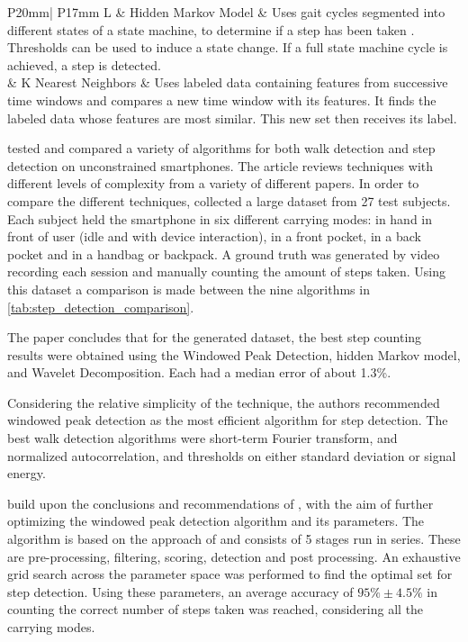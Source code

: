 \begin{table}[]
\begin{tabularx}{\linewidth}{ P{20mm}| P{17mm} L}
		 & Hidden Markov Model & Uses gait cycles segmented into different states of a state machine, to determine if a step has been taken \cite{Ren2016a}. Thresholds can be used to induce a state change. If a full state machine cycle is achieved, a step is detected.\\ 
		& K Nearest Neighbors & Uses labeled data containing features from successive time windows and compares a new time window with its features. It finds the labeled data whose features are most similar. This new set then receives its label. \\
		\bottomrule
	\end{tabularx}
	\caption{Overview of different step detection methods using inertial sensors.}
	\label{tab:step_detection_comparison}
\end{table}

\citet{Brajdic2013} tested and compared a variety of algorithms for both walk detection and step detection on unconstrained smartphones. The article reviews techniques with different levels of complexity from a variety of different papers. In order to compare the different techniques, \cite{Brajdic2013} collected a large dataset from 27 test subjects. Each subject held the smartphone in six different carrying modes: in hand in front of user (idle and with device interaction), in a front pocket, in a back pocket and in a handbag or backpack. A ground truth was generated by video recording each session and manually counting the amount of steps taken. Using this dataset a comparison is made between the nine algorithms in \cref{tab:step_detection_comparison}.\par 
The paper concludes that for the generated dataset, the best step counting results were obtained using the Windowed Peak Detection, hidden Markov model, and Wavelet Decomposition. Each had a median error of about 1.3\%.\par 
Considering the relative simplicity of the technique, the authors recommended windowed peak detection as the most efficient algorithm for step detection. The best walk detection algorithms were short-term Fourier transform, and normalized autocorrelation, and thresholds on either standard deviation or signal energy.\par
\citet{Salvi2018} build upon the conclusions and recommendations of \citet{Brajdic2013}, with the aim of further optimizing the windowed peak detection algorithm and its parameters. The algorithm is based on the approach of \citet{Palshikar2009} and consists of 5 stages run in series. These are pre-processing, filtering, scoring, detection and post processing. An exhaustive grid search across the parameter space was performed to find the optimal set for step detection. Using these parameters, an average accuracy of $95\% \pm 4.5\%$ in counting the correct number of steps taken was reached, considering all the carrying modes. 

